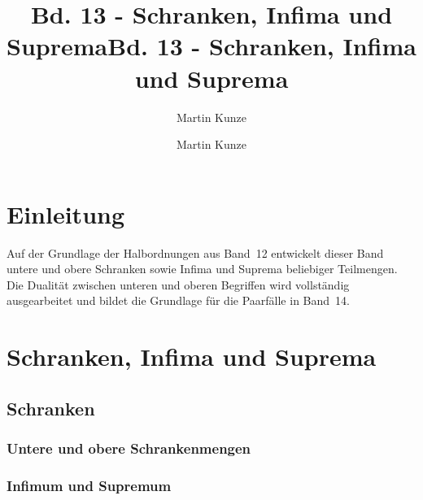 \documentclass[main.tex]{subfiles}
\title{Bd. 13 - Schranken, Infima und Suprema}
\author{Martin Kunze}
\date{}
\begin{document}
\title{Bd. 13 - Schranken, Infima und Suprema}
\author{Martin Kunze}
\date{}
\hypersetup{pageanchor=false}
\maketitle
\hypersetup{pageanchor=true}
\setcounter{tocdepth}{3}
\tableofcontents
\setcounter{file}{13}
\renewcommand{\FormulaBandID}{13}
\chapter{Einleitung}

Auf der Grundlage der Halbordnungen aus Band~12 entwickelt dieser Band untere
und obere Schranken sowie Infima und Suprema beliebiger Teilmengen. Die
Dualität zwischen unteren und oberen Begriffen wird vollständig ausgearbeitet
und bildet die Grundlage für die Paarfälle in Band~14.

\chapter{Schranken, Infima und Suprema}
\section{Schranken}

\subsection{Untere und obere Schrankenmengen}



\subsection{Infimum und Supremum}

\end{document}
